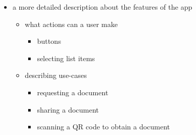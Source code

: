 \begin{itemize}
	\item a more detailed description about the features of the app
	\begin{itemize}
		\item what actions can a user make
		\begin{itemize}
			\item buttons
			\item selecting list items
		\end{itemize}
		\item describing use-cases
		\begin{itemize}
			\item requesting a document
			\item sharing a document
			\item scanning a QR code to obtain a document
		\end{itemize}
	\end{itemize}
\end{itemize}
